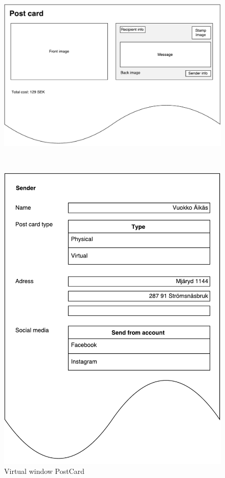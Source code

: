 \documentclass[10pt,a4paper]{article}
\begin{document}
\begin{centering}
\begin{figure}[!ht]
\begin{minipage}{0.3\textwidth}
\includegraphics[width=\linewidth]{Data_figures/virtualwindows_postcard.pdf}
\caption{Virtual window PostCard}
\label{fig:virtualwindows_postcard}
\end{minipage}\hfill
~
\begin{minipage}{0.3\textwidth}
\includegraphics[width=\linewidth]{Data_figures/virtualwindows_sender.pdf}

\end{minipage}
\end{figure}
\end{centering}
\end{document}
